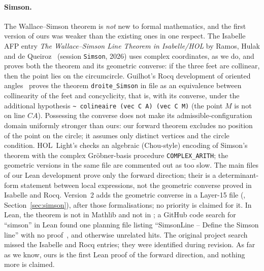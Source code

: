 \documentclass[11pt]{article}
\theoremstyle{definition}
\theoremstyle{remark}
\newcommand{\lean}[1]{\texttt{#1}}
\begin{document}
\paragraph{Simson.} The Wallace--Simson theorem is \emph{not} new to formal mathematics, and the
first version of ours was weaker than the existing ones in one respect. The Isabelle AFP entry \emph{The
Wallace--Simson Line Theorem in Isabelle/HOL} by Ramos, Hulak and de Queiroz~\cite{AFPSimson}
(session \lean{Simson}, 2026) uses complex coordinates, as we do, and proves both the theorem and
its geometric converse: if the three feet are collinear, then the point lies on the circumcircle.
Guilhot's Rocq development of oriented angles~\cite{GuilhotAngles,Guilhot} proves the theorem
\lean{droite\_Simson} in file  as an equivalence between collinearity of the
feet and concyclicity, that is, with its converse, under the additional hypothesis
\lean{\textasciitilde{} colineaire (vec C A) (vec C M)} (the point $M$ is not on line $CA$). Possessing
the converse does not make its admissible-configuration domain uniformly stronger than ours: our
forward theorem excludes no position of the point on the circle; it assumes only distinct
vertices and the circle condition. HOL~Light's 
\cite{HOLGrobner} checks an algebraic (Chou-style) encoding of Simson's theorem with the complex
Gr\"obner-basis procedure \lean{COMPLEX\_ARITH}; the geometric versions in the same file are
commented out as too slow. The main files of our Lean development prove only the forward direction; their
 is a determinant-form statement between local
expressions, not the geometric converse proved in Isabelle and Rocq. Version~2 adds the geometric
converse in a Layer-15 file (, Section~\ref{sec:simson}), after
those formalisations; no priority is claimed for it. In Lean, the theorem is not in Mathlib and not in
; a GitHub code search for ``simson'' in Lean found one planning file listing
``SimsonLine -- Define the Simson line'' with no proof~\cite{EGPlan}, and otherwise unrelated hits.
The original project search missed the Isabelle and Rocq entries; they were identified during
revision. As far as we know, ours is the first Lean proof of the forward direction, and nothing
more is claimed.
\end{document}
